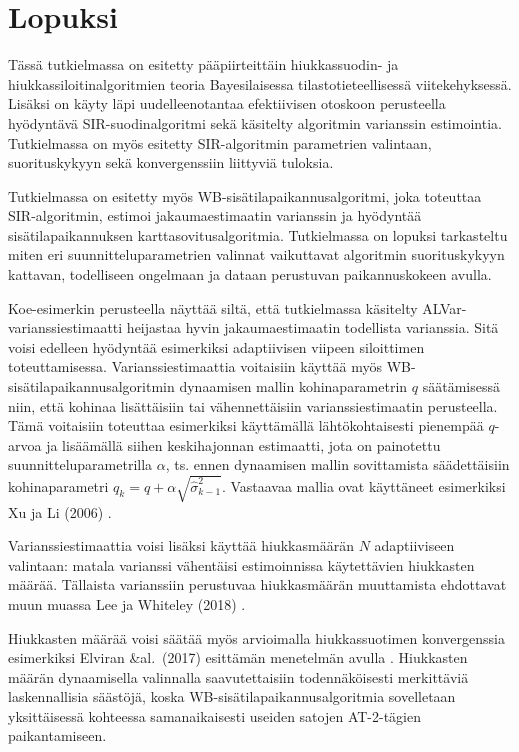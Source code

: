 \documentclass[
  12pt,
  a4paper, twoside]{book}
\begin{document}
\chapter{Lopuksi}\label{lopuksi}

Tässä tutkielmassa on esitetty pääpiirteittäin hiukkassuodin- ja hiukkassiloitinalgoritmien teoria Bayesilaisessa tilastotieteellisessä viitekehyksessä. Lisäksi on käyty läpi uudelleenotantaa efektiivisen otoskoon perusteella hyödyntävä SIR-suodinalgoritmi sekä käsitelty algoritmin varianssin estimointia. Tutkielmassa on myös esitetty SIR-algoritmin parametrien valintaan, suorituskykyyn sekä konvergenssiin liittyviä tuloksia.

Tutkielmassa on esitetty myös WB-sisätilapaikannusalgoritmi, joka toteuttaa SIR-algoritmin, estimoi jakaumaestimaatin varianssin ja hyödyntää sisätilapaikannuksen karttasovitusalgoritmia. Tutkielmassa on lopuksi tarkasteltu miten eri suunnitteluparametrien valinnat vaikuttavat algoritmin suorituskykyyn kattavan, todelliseen ongelmaan ja dataan perustuvan paikannuskokeen avulla.

Koe-esimerkin perusteella näyttää siltä, että tutkielmassa käsitelty ALVar-varianssiestimaatti heijastaa hyvin jakaumaestimaatin todellista varianssia. Sitä voisi edelleen hyödyntää esimerkiksi adaptiivisen viipeen siloittimen toteuttamisessa. Varianssiestimaattia voitaisiin käyttää myös WB-sisätilapaikannusalgoritmin dynaamisen mallin kohinaparametrin \(q\) säätämisessä niin, että kohinaa lisättäisiin tai vähennettäisiin varianssiestimaatin perusteella. Tämä voitaisiin toteuttaa esimerkiksi käyttämällä lähtökohtaisesti pienempää \(q\)-arvoa ja lisäämällä siihen keskihajonnan estimaatti, jota on painotettu suunnitteluparametrilla \(\alpha\), ts. ennen dynaamisen mallin sovittamista säädettäisiin kohinaparametri \(q_k = q+\alpha\sqrt{\hat{\sigma}^2_{k-1}}\). Vastaavaa mallia ovat käyttäneet esimerkiksi Xu ja Li (2006) \citep{Xu-2006}.

Varianssiestimaattia voisi lisäksi käyttää hiukkasmäärän \(N\) adaptiiviseen valintaan: matala varianssi vähentäisi estimoinnissa käytettävien hiukkasten määrää. Tällaista varianssiin perustuvaa hiukkasmäärän muuttamista ehdottavat muun muassa Lee ja Whiteley (2018) \citep{Lee-2018}.

Hiukkasten määrää voisi säätää myös arvioimalla hiukkassuotimen konvergenssia esimerkiksi Elviran \&al.~(2017) esittämän menetelmän avulla \citep{Elvira-2017}. Hiukkasten määrän dynaamisella valinnalla saavutettaisiin todennäköisesti merkittäviä laskennallisia säästöjä, koska WB-sisätilapaikannusalgoritmia sovelletaan yksittäisessä kohteessa samanaikaisesti useiden satojen AT-2-tägien paikantamiseen.
\end{document}
